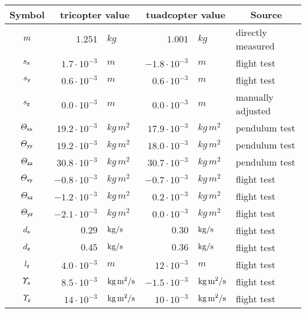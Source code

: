 \begin{table}
 \centering
 \setlength{\tabcolsep}{.1em}
 \begin{tabular}{crlrll}
  \toprule
  Symbol & \multicolumn{2}{c}{tricopter value} & \multicolumn{2}{c}{tuadcopter value} & \multicolumn{1}{c}{Source} \\
  \midrule
  $\quad m\quad$ & $1.251$&$\unit{kg}$ & $1.001$&$\unit{kg}$ & directly measured
  \\[1ex]
  $s_{\mathsf{x}}$ & $ 1.7 \cdot 10^{-3}$&$\unit{m}$ & $ -1.8 \cdot 10^{-3}$&$\unit{m}$ & flight test \\
  $s_{\mathsf{y}}$ & $ 0.6 \cdot 10^{-3}$&$\unit{m}$ & $ 0.6 \cdot 10^{-3}$&$\unit{m}$ & flight test \\
  $s_{\mathsf{z}}$ & $ 0.0 \cdot 10^{-3}$&$\unit{m}$ & $ 0.0 \cdot 10^{-3}$&$\unit{m}$ & manually adjusted
  \\[1ex]
  $\varTheta_{\mathsf{x}\mathsf{x}}$ & \phantom{|} \qquad $19.2 \cdot 10^{-3}$&$\unit{kg}\,\unit{m}^2$ \qquad \phantom{|} & \phantom{|} \qquad $17.9 \cdot 10^{-3}$&$\unit{kg}\,\unit{m}^2$ \qquad \phantom{|} & pendulum test\\
  $\varTheta_{\mathsf{y}\mathsf{y}}$ & $19.2 \cdot 10^{-3}$&$\unit{kg}\,\unit{m}^2$ & $18.0 \cdot 10^{-3}$&$\unit{kg}\,\unit{m}^2$ & pendulum test \\
  $\varTheta_{\mathsf{z}\mathsf{z}}$ & $30.8 \cdot 10^{-3}$&$\unit{kg}\,\unit{m}^2$ & $30.7 \cdot 10^{-3}$&$\unit{kg}\,\unit{m}^2$ & pendulum test \\
  $\varTheta_{\mathsf{x}\mathsf{y}}$ & $-0.8 \cdot 10^{-3}$&$\unit{kg}\,\unit{m}^2$ & $-0.7 \cdot 10^{-3}$&$\unit{kg}\,\unit{m}^2$ & flight test \\
  $\varTheta_{\mathsf{x}\mathsf{z}}$ & $-1.2 \cdot 10^{-3}$&$\unit{kg}\,\unit{m}^2$ & $ 0.2 \cdot 10^{-3}$&$\unit{kg}\,\unit{m}^2$ & flight test \\
  $\varTheta_{\mathsf{y}\mathsf{z}}$ & $-2.1 \cdot 10^{-3}$&$\unit{kg}\,\unit{m}^2$ & $ 0.0 \cdot 10^{-3}$&$\unit{kg}\,\unit{m}^2$ & flight test 
  \\[1ex]
  $d_{\mathsf{x}}$ & $0.29 $&$\text{kg} / \text{s}$ & $0.30 $&$\text{kg} / \text{s}$ & flight test \\
  $d_{\mathsf{z}}$ & $0.45 $&$\text{kg} / \text{s}$ & $0.36 $&$\text{kg} / \text{s}$ & flight test \\
  $l_{\mathsf{z}}$ & $4.0 \cdot 10^{-3}$&$\unit{m}$ & $12 \cdot 10^{-3}$&$\unit{m}$ & flight test \\
  $\varUpsilon_{\mathsf{x}}$ & $8.5 \cdot 10^{-3}$&$\text{kg}\,\text{m}^2 / \text{s}$ & $-1.5 \cdot 10^{-3}$&$\text{kg}\,\text{m}^2 / \text{s}$ & flight test \\
  $\varUpsilon_{\mathsf{z}}$ & $14 \cdot 10^{-3}$&$\text{kg}\,\text{m}^2 / \text{s}$ & $10 \cdot 10^{-3}$&$\text{kg}\,\text{m}^2 / \text{s}$ & flight test

\end{tabular}
\end{table}
